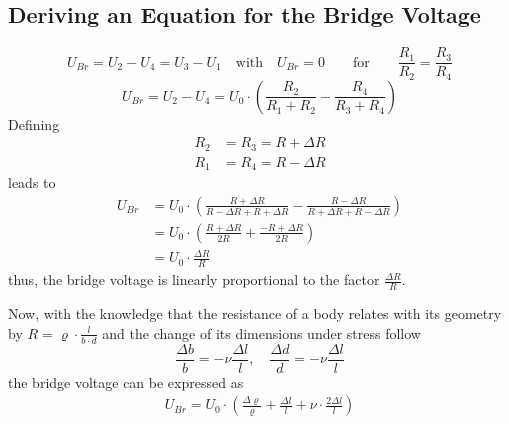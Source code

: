         \subsection{Deriving an Equation for the Bridge Voltage}\label{sec:A4 equation for full bridge circuit}%
            \begin{equation}
                U_{Br} = U_2 - U_4 = U_3 - U_1 \quad \text{with} \quad U_{Br} = 0 \qquad \text{for} \qquad \frac{R_1}{R_2} = \frac{R_3}{R_4}
            \end{equation}
            \begin{equation}
                U_{Br} = U_2 - U_4 = U_0 \cdot \left(\frac{R_2}{R_1 + R_2} - \frac{R_4}{R_3 + R_4}\right)
            \end{equation}
            Defining
            \begin{align}
                R_2 &= R_3 = R + \Delta R \\
                R_1 &= R_4 = R - \Delta R
            \end{align}
            leads to
            \begin{align}
                U_{Br}  &= U_0 \cdot \left(\frac{R + \Delta R}{R - \Delta R + R + \Delta R} - \frac{R - \Delta R}{R + \Delta R + R - \Delta R}\right) \nonumber \\
                        &= U_0 \cdot \left(\frac{R+\Delta R}{2R} + \frac{-R + \Delta R}{2R}\right) \nonumber \\
                        &= U_0 \cdot \frac{\Delta R}{R}
                \label{eq:Ubr and delta R}
            \end{align}
            thus, the bridge voltage is linearly proportional to the factor \( \frac{\Delta R}{R} \).\par
            Now, with the knowledge that the resistance of a body relates with its geometry by
            \( R = \varrho \cdot \frac{l}{b \cdot d} \) and the change of its dimensions under stress follow
            \begin{equation}
                \frac{\Delta b}{b} = -\nu \frac{\Delta l}{l}, \quad \frac{\Delta d}{d} = -\nu \frac{\Delta l}{l}
            \end{equation}
            the bridge voltage can be expressed as
            \begin{align}
                U_{Br} = U_0 \cdot \left( \frac{\Delta \varrho}{\varrho} + \frac{\Delta l}{l} + \nu \cdot \frac{2 \Delta l}{l}\right)
            \end{align}
